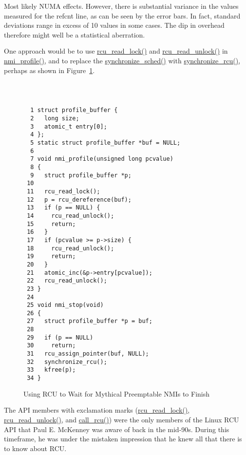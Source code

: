 
Most likely NUMA effects.
However, there is substantial variance in the values measured for the
refcnt line, as can be seen by the error bars.
In fact, standard deviations range in excess of 10%
values in some cases.
The dip in overhead therefore might well be a statistical aberration.


One approach would be to use
\url{rcu_read_lock()} and \url{rcu_read_unlock()}
in \url{nmi_profile()}, and to replace the
\url{synchronize_sched()} with \url{synchronize_rcu()},
perhaps as shown in
Figure~\ref{fig:defer:Using RCU to Wait for Mythical Preemptable NMIs to Finish}.
\\ ~ \\
\begin{figure}[tbp]
{ \tt \scriptsize
\begin{verbatim}
  1 struct profile_buffer {
  2   long size;
  3   atomic_t entry[0];
  4 };
  5 static struct profile_buffer *buf = NULL;
  6 
  7 void nmi_profile(unsigned long pcvalue)
  8 {
  9   struct profile_buffer *p;
 10 
 11   rcu_read_lock();
 12   p = rcu_dereference(buf);
 13   if (p == NULL) {
 14     rcu_read_unlock();
 15     return;
 16   }
 17   if (pcvalue >= p->size) {
 18     rcu_read_unlock();
 19     return;
 20   }
 21   atomic_inc(&p->entry[pcvalue]);
 22   rcu_read_unlock();
 23 }
 24 
 25 void nmi_stop(void)
 26 {
 27   struct profile_buffer *p = buf;
 28 
 29   if (p == NULL)
 30     return;
 31   rcu_assign_pointer(buf, NULL);
 32   synchronize_rcu();
 33   kfree(p);
 34 }
\end{verbatim}
}
\caption{Using RCU to Wait for Mythical Preemptable NMIs to Finish}
\label{fig:defer:Using RCU to Wait for Mythical Preemptable NMIs to Finish}
\end{figure}



The API members with exclamation marks (\url{rcu_read_lock()},
\url{rcu_read_unlock()}, and \url{call_rcu()}) were the
only members of the Linux RCU API that Paul E. McKenney was aware of back
in the mid-90s.
During this timeframe, he was under the mistaken impression that
he knew all that there is to know about RCU.

